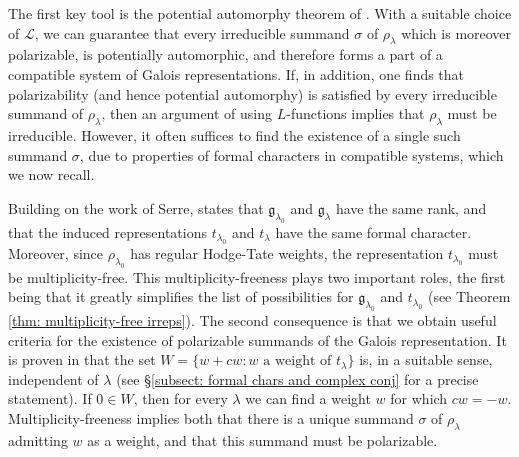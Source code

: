 \documentclass{amsart}
\theoremstyle{definition}
\numberwithin{equation}{section} %
\newcommand{\mc}[1]{\mathcal{#1}}
\newcommand{\mf}[1]{\mathfrak{#1}}
\begin{document}
The first key tool is the potential automorphy theorem of \cite{BLGGT14}.
With a suitable choice of $\mc{L}$, we can guarantee that every irreducible summand $\sigma$ of $\rho_\lambda$ which is moreover polarizable, is potentially automorphic, and therefore forms a part of a compatible system of Galois representations. 
If, in addition, one finds that polarizability (and hence potential automorphy) is satisfied by every irreducible summand of $\rho_\lambda$, then an argument of \cite{BLGGT14} using $L$-functions implies that $\rho_\lambda$ must be irreducible.
However, it often suffices to find the existence of a single such summand $\sigma$, due to properties of formal characters in compatible systems, which we now recall.

Building on the work of Serre, \cite[Theorem 3.19]{hui2013monodromy} states that \( \mf{g}_{\lambda_0} \) and \( \mf{g}_{\lambda} \) have the same rank, and that the induced representations \( t_{\lambda_0} \) and \( t_{\lambda} \) have the same formal character. Moreover, since \( \rho_{\lambda_0} \) has regular Hodge-Tate weights, the representation \( t_{\lambda_0} \) must be multiplicity-free.
This multiplicity-freeness plays two important roles, the first being that it greatly simplifies the list of possibilities for $\mf{g}_{\lambda_0}$ and $t_{\lambda_0}$ (see Theorem \ref{thm: multiplicity-free irreps}).
The second consequence is that we obtain useful criteria for the existence of polarizable summands of the Galois representation.
It is proven in \cite{Xia19} that the set $W =\{w + cw: w \text{ a weight of } t_\lambda\}$ is, in a suitable sense, independent of $\lambda$ (see \S \ref{subsect: formal chars and complex conj} for a precise statement).
If $0 \in W$, then for every $\lambda$ we can find a weight $w$ for which $cw = -w$.
Multiplicity-freeness implies both that there is a unique summand $\sigma$ of $\rho_\lambda$ admitting $w$ as a weight, and that this summand must be polarizable.
\end{document}
